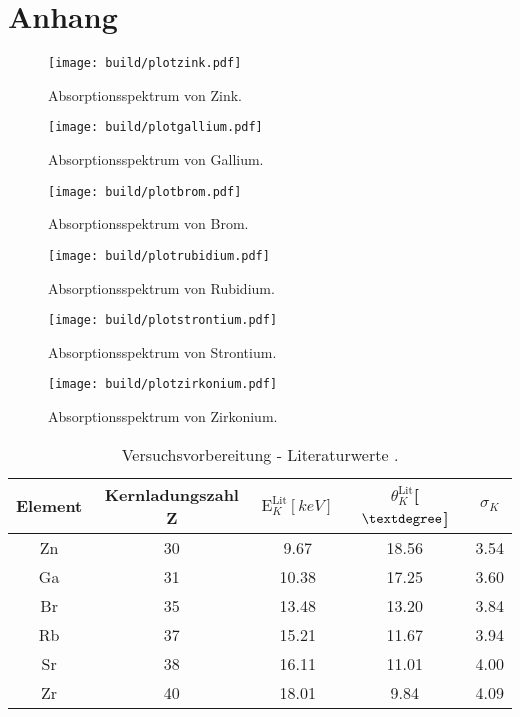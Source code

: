 \section{Anhang}

\begin{figure}[h]
  \centering
  \texttt{[image: build/plotzink.pdf]}
  \caption{Absorptionsspektrum von Zink.}
  \label{fig:plotzink}
\end{figure}
\begin{figure}[h]
  \centering
  \texttt{[image: build/plotgallium.pdf]}
  \caption{Absorptionsspektrum von Gallium.}
  \label{fig:plotgallium}
\end{figure}
\begin{figure}[h]
  \centering
  \texttt{[image: build/plotbrom.pdf]}
  \caption{Absorptionsspektrum von Brom.}
  \label{fig:plotbrom}
\end{figure}
\begin{figure}[h]
  \centering
  \texttt{[image: build/plotrubidium.pdf]}
  \caption{Absorptionsspektrum von Rubidium.}
  \label{fig:plotrubidium}
\end{figure}
\begin{figure}[h]
  \centering
  \texttt{[image: build/plotstrontium.pdf]}
  \caption{Absorptionsspektrum von Strontium.}
  \label{fig:plotstrontium}
\end{figure}
\begin{figure}[h]
  \centering
  \texttt{[image: build/plotzirkonium.pdf]}
  \caption{Absorptionsspektrum von Zirkonium.}
  \label{fig:plotzirkonium}
\end{figure}

\begin{table}
        \caption{Versuchsvorbereitung - Literaturwerte \cite{database}.}
        \centering
        \label{tab:vorbereitung}
        \begin{tabular}{c c c c c}
            \toprule
              Element & Kernladungszahl Z & $\text{E}_K^{\text{Lit}} [\si{keV}]$  & $\theta_K^{\text{Lit}} $[$\textdegree$] & $\sigma_K$ \\
            \midrule
                Zn & 30 & 9.67  &  18.56 & 3.54\\
                Ga & 31 & 10.38 &  17.25 & 3.60\\
                Br & 35 & 13.48 &  13.20 & 3.84\\
                Rb & 37 & 15.21 &  11.67 & 3.94\\
                Sr & 38 & 16.11 &  11.01 & 4.00\\
                Zr & 40 & 18.01 &  9.84  & 4.09\\
            \bottomrule    
        \end{tabular}
\end{table}

